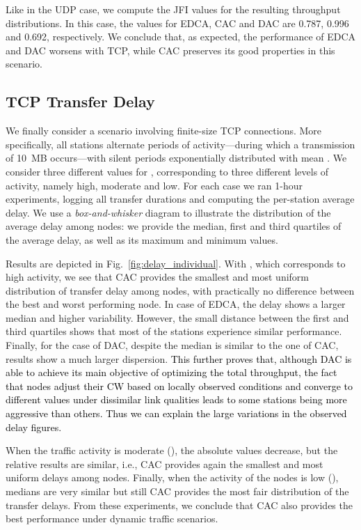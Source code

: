 \documentclass[a4paper,10pt]{article}
\newcommand{\revs}[1]{\textcolor{black}{#1}}
\begin{document}
Like in the UDP case, we compute the JFI values for the resulting throughput distributions. In this case, the values for EDCA, CAC and DAC are 0.787, 0.996 and 0.692, respectively. We conclude that, as expected, the performance of EDCA and DAC worsens with TCP, while CAC preserves its good properties in this scenario.

\vspace{0.5em}
\subsection{TCP Transfer Delay}

We finally consider a scenario involving finite-size TCP connections. More specifically, all stations alternate periods of activity---during which a transmission of 10~MB occurs---with silent periods exponentially distributed with mean  \cite{Crovella98}. We consider three different values for , corresponding to three different levels of activity, namely high, moderate and low. For each case we ran 1-hour experiments, logging all transfer durations and computing the per-station average delay. We use a \emph{box-and-whisker} diagram to illustrate the distribution of the average delay among nodes: we provide the median, first and third quartiles of the average delay, as well as its maximum and minimum values.

Results are depicted in Fig.~\ref{fig:delay_individual}. With , which corresponds to high activity, we see that CAC provides the smallest and most uniform distribution of transfer delay among nodes, with practically no difference between the best and worst performing node. In case of EDCA, the delay shows a larger median and higher variability. However, the small distance between the first and third quartiles shows that most of the stations experience similar performance. Finally, for the case of DAC, despite the median is similar to the one of CAC, results show a much larger dispersion. \revs{This further proves that, although DAC is able to achieve its main objective of optimizing the total throughput, the fact that nodes adjust their CW based on locally observed conditions and converge to different values under dissimilar link qualities leads to some stations being more aggressive than others. Thus we can explain the large variations in the observed delay figures.}

When the traffic activity is moderate (), the absolute values decrease, but the relative results are similar, i.e., CAC provides again the smallest and most uniform delays among nodes. Finally, when the activity of the nodes is low (), medians are very similar but still CAC provides the most fair distribution of the transfer delays. From these experiments, we conclude that CAC also provides the best performance under dynamic traffic scenarios. 
\end{document}
